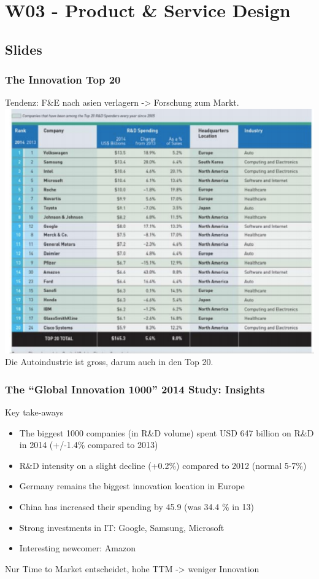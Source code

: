\section{W03 - Product \& Service Design}
\subsection{Slides}
\subsubsection{The Innovation Top 20}
Tendenz: F\&E nach asien verlagern -> Forschung zum Markt.\\
\includegraphics[width=1\textwidth]{W03/top20}
Die Autoindustrie ist gross, darum auch in den Top 20.
\subsubsection{The “Global Innovation 1000” 2014 Study: Insights}
Key take-aways
\begin{itemize}
\item The biggest 1000 companies (in R\&D volume) spent USD 647
billion on R\&D in 2014 (+/-1.4\% compared to 2013)
\item R\&D intensity on a slight decline (+0.2\%) compared to 2012 (normal 5-7\%)
\item Germany remains the biggest innovation location in Europe
\item China has increased their spending by 45.9 (was 34.4 \% in 13)
\item Strong investments in IT: Google, Samsung, Microsoft
\item Interesting newcomer: Amazon
\end{itemize}
Nur Time to Market entscheidet, hohe TTM -> weniger Innovation
